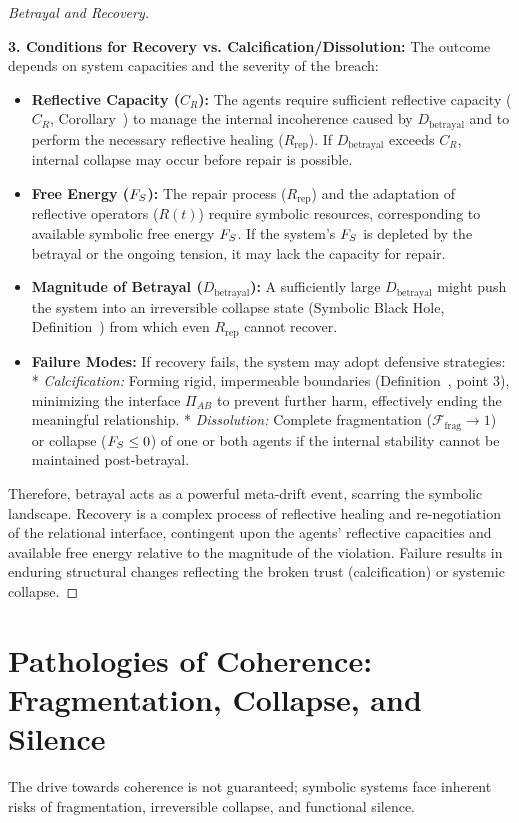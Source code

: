 \begin{proof}[Betrayal and Recovery]
\begin{itemize}
\end{itemize}
\textbf{3. Conditions for Recovery vs. Calcification/Dissolution:}
The outcome depends on system capacities and the severity of the breach:
\begin{itemize}
    \item \textbf{Reflective Capacity ($C_R$):} The agents require sufficient reflective capacity ($C_R$, Corollary~) to manage the internal incoherence caused by $D_{\text{betrayal}}$ and to perform the necessary reflective healing ($R_{\text{rep}}$). If $D_{\text{betrayal}}$ exceeds $C_R$, internal collapse may occur before repair is possible.
    \item \textbf{Free Energy ($F_S$):} The repair process ($R_{\text{rep}}$) and the adaptation of reflective operators ($R(t)$) require symbolic resources, corresponding to available symbolic free energy $F_S$. If the system's $F_S$ is depleted by the betrayal or the ongoing tension, it may lack the capacity for repair.
    \item \textbf{Magnitude of Betrayal ($D_{\text{betrayal}}$):} A sufficiently large $D_{\text{betrayal}}$ might push the system into an irreversible collapse state (Symbolic Black Hole, Definition~) from which even $R_{\text{rep}}$ cannot recover.
    \item \textbf{Failure Modes:} If recovery fails, the system may adopt defensive strategies:
        *   \emph{Calcification:} Forming rigid, impermeable boundaries (Definition~, point 3), minimizing the interface $\Pi_{AB}$ to prevent further harm, effectively ending the meaningful relationship.
        *   \emph{Dissolution:} Complete fragmentation ($\mathcal{F}_{\text{frag}} \to 1$) or collapse ($F_S \le 0$) of one or both agents if the internal stability cannot be maintained post-betrayal.
\end{itemize}
Therefore, betrayal acts as a powerful meta-drift event, scarring the symbolic landscape. Recovery is a complex process of reflective healing and re-negotiation of the relational interface, contingent upon the agents' reflective capacities and available free energy relative to the magnitude of the violation. Failure results in enduring structural changes reflecting the broken trust (calcification) or systemic collapse.
\end{proof}
\section{Pathologies of Coherence: Fragmentation, Collapse, and Silence}
\label{sec:bk9_pathologies_of_coherence}
The drive towards coherence is not guaranteed; symbolic systems face inherent risks of fragmentation, irreversible collapse, and functional silence.
